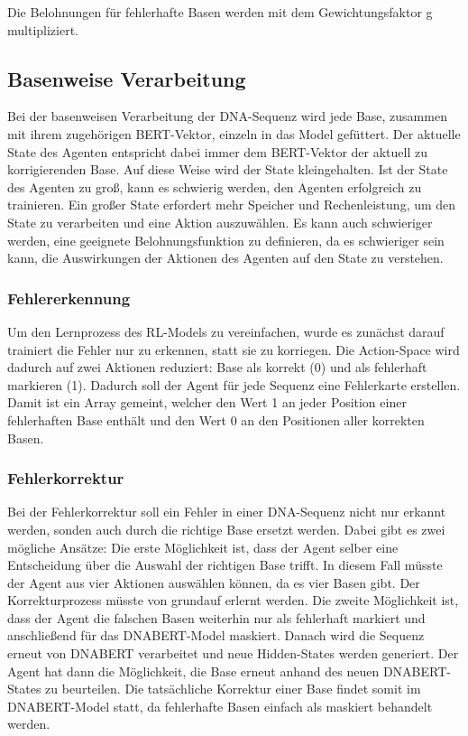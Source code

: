 \documentclass[oneside,bibliography=totocnumbered,BCOR=5mm]{scrbook}%
\theoremstyle{definition}
\theoremstyle{definition}
\theoremstyle{definition}
\theoremstyle{definition}
\theoremstyle{definition}
\theoremstyle{definition}
\begin{document}
Die Belohnungen für fehlerhafte Basen werden mit dem Gewichtungsfaktor g multipliziert.



\subsection{Basenweise Verarbeitung}
Bei der basenweisen Verarbeitung der DNA-Sequenz wird jede Base, zusammen mit ihrem zugehörigen BERT-Vektor, 
einzeln in das Model gefüttert.
Der aktuelle State des Agenten entspricht dabei immer dem BERT-Vektor der aktuell zu korrigierenden Base. 
Auf diese Weise wird der State kleingehalten. Ist der State des Agenten zu groß, kann es schwierig werden, 
den Agenten erfolgreich zu trainieren. Ein großer State erfordert mehr Speicher und Rechenleistung, 
um den State zu verarbeiten und eine Aktion auszuwählen. 
Es kann auch schwieriger werden, eine geeignete Belohnungsfunktion zu definieren, 
da es schwieriger sein kann, die Auswirkungen der Aktionen des Agenten auf den State zu verstehen.


\subsubsection{Fehlererkennung}
Um den Lernprozess des RL-Models zu vereinfachen, wurde es zunächst darauf trainiert die Fehler nur zu erkennen, statt sie zu korriegen.
Die Action-Space wird dadurch auf zwei Aktionen reduziert: Base als korrekt (0) und als fehlerhaft markieren (1).
Dadurch soll der Agent für jede Sequenz eine Fehlerkarte erstellen. 
Damit ist ein Array gemeint, welcher den Wert 1 an jeder Position einer fehlerhaften Base enthält und den Wert 0 an den Positionen aller korrekten Basen.

\subsubsection{Fehlerkorrektur}
Bei der Fehlerkorrektur soll ein Fehler in einer DNA-Sequenz nicht nur erkannt werden, sonden auch durch die richtige Base ersetzt werden.
Dabei gibt es zwei mögliche Ansätze: 
Die erste Möglichkeit ist, dass der Agent selber eine Entscheidung über die Auswahl der richtigen Base trifft. 
In diesem Fall müsste der Agent aus vier Aktionen auswählen können, da es vier Basen gibt. 
Der Korrekturprozess müsste von grundauf erlernt werden.
Die zweite Möglichkeit ist, dass der Agent die falschen Basen weiterhin nur als fehlerhaft markiert
und anschließend für das DNABERT-Model maskiert. 
Danach wird die Sequenz erneut von DNABERT verarbeitet
und neue Hidden-States werden generiert. Der Agent hat dann die Möglichkeit,
die Base erneut anhand des neuen DNABERT-States zu beurteilen. 
Die tatsächliche Korrektur einer Base findet somit im DNABERT-Model statt, da fehlerhafte
Basen einfach als maskiert behandelt werden.
\end{document}
